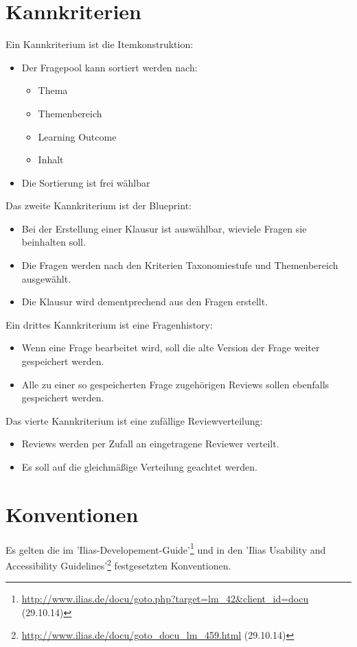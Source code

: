 \documentclass[a4paper]{scrreprt}
\begin{document}
\section{Kannkriterien}
Ein Kannkriterium ist die Itemkonstruktion:
\begin{itemize}
\item Der Fragepool kann sortiert werden nach:
\begin{itemize}
\item Thema
\item Themenbereich
\item Learning Outcome
\item Inhalt
\end{itemize}
\item Die Sortierung ist frei wählbar
\end{itemize}
Das zweite Kannkriterium ist der Blueprint:
\begin{itemize}
\item Bei der Erstellung einer Klausur ist auswählbar, wieviele Fragen sie beinhalten soll.
\item Die Fragen werden nach den Kriterien Taxonomiestufe und Themenbereich ausgewählt. 
\item Die Klausur wird dementprechend aus den Fragen erstellt.
\end{itemize}
Ein drittes Kannkriterium ist eine Fragenhistory:
\begin{itemize}
\item Wenn eine Frage bearbeitet wird, soll die alte Version der Frage weiter gespeichert werden.
\item Alle zu einer so gespeicherten Frage zugehörigen Reviews sollen ebenfalls gespeichert werden.
\end{itemize}
Das vierte Kannkriterium ist eine zufällige Reviewverteilung:
\begin{itemize}
\item Reviews werden per Zufall an eingetragene Reviewer verteilt.
\item Es soll auf die gleichmäßige Verteilung geachtet werden.
\end{itemize}



\section{Konventionen}
Es gelten die im 'Ilias-Developement-Guide'\footnote{\url{http://www.ilias.de/docu/goto.php?target=lm_42&client_id=docu} (29.10.14)} und in den 'Ilias Usability and Accessibility Guidelines'\footnote{\url{http://www.ilias.de/docu/goto_docu_lm_459.html} (29.10.14)} festgesetzten Konventionen.
\end{document}
